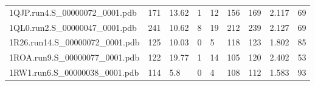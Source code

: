 \documentclass{bioinfo}
\begin{document}
\begin{table}[!t]
{\begin{tabular}{lllllllll}
    1QJP.run4.S\_00000072\_0001.pdb & 171      & 13.62      & 1           & 12          & 156         & 169     & 2.117           & 69           \\
    1QL0.run2.S\_00000047\_0001.pdb & 241      & 10.62      & 8           & 19          & 212         & 239     & 2.127           & 69           \\
    1R26.run14.S\_00000072\_0001.pdb & 125      & 10.03      & 0           & 5           & 118         & 123     & 1.802           & 85           \\
    1ROA.run9.S\_00000077\_0001.pdb & 122      & 19.77      & 1           & 14          & 105         & 120     & 2.402           & 53           \\
    1RW1.run6.S\_00000038\_0001.pdb & 114      & 5.8        & 0           & 4           & 108         & 112     & 1.583           & 93           \\
\end{tabular}}{}
\end{table}
\end{document}

